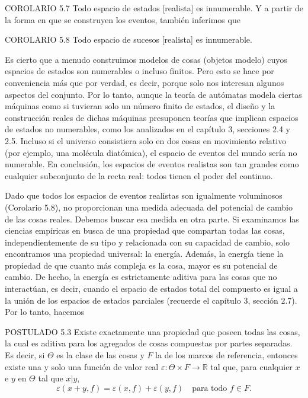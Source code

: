 \begin{justifying}
    \bigskip
    \noindent COROLARIO 5.7 Todo espacio de estados [realista] es innumerable. Y a partir de la forma en que se construyen los eventos, también inferimos que

    \bigskip
    \noindent COROLARIO 5.8 Todo espacio de sucesos [realista] es innumerable.

    Es cierto que a menudo construimos modelos de cosas (objetos modelo) cuyos espacios de estados son numerables o incluso finitos. Pero esto se hace por conveniencia 
    más que por verdad, es decir, porque solo nos interesan algunos aspectos del conjunto. Por lo tanto, aunque la teoría de autómatas modela ciertas máquinas como si 
    tuvieran solo un número finito de estados, el diseño y la construcción reales de dichas máquinas presuponen teorías que implican espacios de estados no numerables, 
    como los analizados en el capítulo 3, secciones 2.4 y 2.5. Incluso si el universo consistiera solo en dos cosas en movimiento relativo (por ejemplo, una molécula diatómica), 
    el espacio de eventos del mundo sería no numerable. En conclusión, los espacios de eventos realistas son tan grandes como cualquier subconjunto de la recta real: 
    todos tienen el poder del continuo.

    Dado que todos los espacios de eventos realistas son igualmente voluminosos (Corolario 5.8), no proporcionan una medida adecuada del potencial de cambio de las cosas reales. 
    Debemos buscar esa medida en otra parte. Si examinamos las ciencias empíricas en busca de una propiedad que compartan todas las cosas, independientemente de su tipo y relacionada 
    con su capacidad de cambio, solo encontramos una propiedad universal: la energía. Además, la energía tiene la propiedad de que cuanto más compleja es la cosa, mayor es su potencial de 
    cambio. De hecho, la energía es estrictamente aditiva para las cosas que no interactúan, es decir, cuando el espacio de estados total del compuesto es igual a la unión de los espacios de 
    estados parciales (recuerde el capítulo 3, sección 2.7). Por lo tanto, hacemos

    \noindent POSTULADO 5.3 Existe exactamente una propiedad que poseen todas las cosas, la cual es aditiva para los agregados de cosas compuestas por partes separadas. Es decir, 
    si $\Theta$ es la clase de las cosas y $F$ la de los marcos de referencia, entonces existe una y solo una función de valor real $\varepsilon: \Theta \times F \to \mathbb{R}$ 
    tal que, para cualquier $x$ e $y$ en $\Theta$ tal que $x|y$,
    \[
        \varepsilon(x+y,f) = \varepsilon(x,f) + \varepsilon(y,f) \quad \text{para todo } f \in F.
    \]


\end{justifying}
